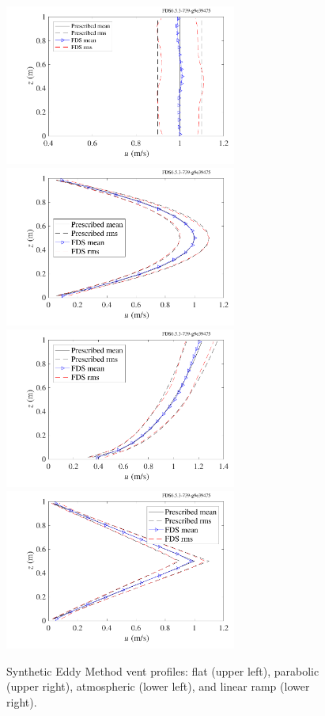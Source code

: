 \documentclass[11pt]{book}
\begin{document}
\begin{figure}[ht]
\centering
\includegraphics[width=3in]{SCRIPT_FIGURES/sem_flat_leddy_p2}
\includegraphics[width=3in]{SCRIPT_FIGURES/sem_par_leddy_p2}
\includegraphics[width=3in]{SCRIPT_FIGURES/sem_atm_leddy_p2}
\includegraphics[width=3in]{SCRIPT_FIGURES/sem_ramp_leddy_p2}
\caption[Synthetic Eddy Method vent profiles]{Synthetic Eddy Method vent profiles: flat (upper left), parabolic (upper right), atmospheric (lower left), and linear ramp (lower right).}
\label{fig:sem_profiles}
\end{figure}
\end{document}

